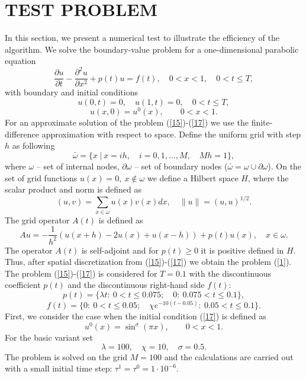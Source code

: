 \documentclass{aip-cp}
\begin{document}
\section{TEST PROBLEM}
In this section, we present a numerical test to illustrate the efficiency of the algorithm. We solve the boundary-value problem for a one-dimensional parabolic equation
\begin{equation}\label{15}
  \frac{\partial u}{\partial t} - \frac{\partial^2 u}{\partial x^2} + p(t) u = f(t),
  \quad 0 < x < 1,
  \quad 0 < t \leq  T ,  
\end{equation}
with boundary and initial conditions
\begin{equation}\label{16}
  u(0, t) = 0,
  \quad u(1,t) = 0,
  \quad 0 < t \leq  T , 
\end{equation}
\begin{equation}\label{17}
  u(x,0) = u^0(x),
  \quad  \quad 0 <  x <  1 .
\end{equation}
For an approximate solution of the problem (\ref{15})-(\ref{17}) we use the finite-difference approximation with respect to space. 
Define the uniform grid with step $h$ as following
\[
  \bar{\omega} = \{ x \ | \ x = ih, \quad i = 0, 1, ..., M, \quad Mh = 1 \},  
\] 
where $\omega$ -- set of internal nodes, $\partial\omega$ -- set of boundary nodes ($\bar{\omega } = \omega \cup \partial \omega$).
On the set of grid functions $u(x) = 0, \ x \notin \omega$  we define a Hilbert space $H$, where the scalar product and norm is defined as
\[
 (u,v) = \sum_{x \in \omega} u(x) v(x) dx,
 \quad \|u\| = (u,u)^{1/2} . 
\]
The grid operator $ A (t) $ is defined as
\[
 A u = - \frac{1}{h^2} (u(x+h) - 2 u(x) + u(x-h)) + p(t) u(x),
 \quad x \in \omega . 
\]
The operator $A(t)$ is self-adjoint and for $p(t)\geq 0$ it is positive defined in $H$.
Thus, after spatial discretization from (\ref{15})-(\ref{17}) we obtain the problem (\ref{1}).
The problem (\ref{15})-(\ref{17}) is considered for $T = 0.1$ with the discontinuous coefficient $p(t)$ and the discontinuous right-hand side $f(t)$:
\[
  p(t) = \{\lambda  t: \ 0 < t \leq 0.075;\quad 0: \ 0.075 < t \leq 0.1  
  \}, 
\]
\[
  f(t) = \{0: \ 0 < t \leq 0.05; \quad \chi  e^{-10 (t-0.05)}: \ 0.05 < t \leq 0.1 \} .
\]
First, we consider the case when the initial condition (\ref{17}) is defined as
\[
  u^0(x) = \sin^\sigma (\pi x),
  \quad  \quad 0 <  x <  1 .
\]
For the basic variant set
\[
 \lambda = 100,
 \quad \chi = 10, 
 \quad \sigma = 0.5 . 
\]
The problem is solved on the grid $M = 100$ and the calculations are carried out with a small initial time step: $\tau^1 = \tau^0 = 1 \cdot 10^{-6}$. 
\end{document}
